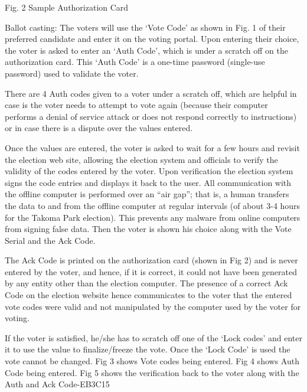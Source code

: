 \bigskip


\bigskip


\bigskip


\bigskip


\bigskip


Fig. 2 Sample Authorization Card

Ballot casting: The voters will use the `Vote Code' as shown in Fig. 1 of their preferred candidate and enter it on the voting portal. Upon entering their choice, the voter is asked to enter an `Auth Code', which is under a scratch off on the authorization card. This `Auth Code' is a one-time password (single-use password) used to validate the voter.

There are 4 Auth codes given to a voter under a scratch off, which are helpful in case is the voter needs to attempt to vote again (because their computer performs a denial of service attack or does not respond correctly to instructions) or in case there is a dispute over the values entered.

Once the values are entered, the voter is asked to wait for a few hours and revisit the election web site, allowing the election system and officials to verify the validity of the codes entered by the voter. Upon verification the election system signs the code entries and displays it back to the user. All communication with the offline computer is performed over an ``air gap''; that is, a human transfers the data to and from the offline computer at regular intervals (of about 3-4 hours for the Takoma Park election). This prevents any malware from online computers from signing false data. Then the voter is shown his choice along with the Vote Serial and the Ack Code.

The Ack Code is printed on the authorization card (shown in Fig 2) and is never entered by the voter, and hence, if it is correct, it could not have been generated by any entity other than the election computer. The presence of a correct Ack Code on the election website hence communicates to the voter that the entered vote codes were valid and not manipulated by the computer used by the voter for voting.

If the voter is satisfied, he/she has to scratch off one of the `Lock codes' and enter it to use the value to finalize/freeze the vote. Once the `Lock Code' is used the vote cannot be changed. Fig 3 shows Vote codes being entered. Fig 4 shows Auth Code being entered. Fig 5 shows the verification back to the voter along with the Auth and Ack Code-EB3C15

